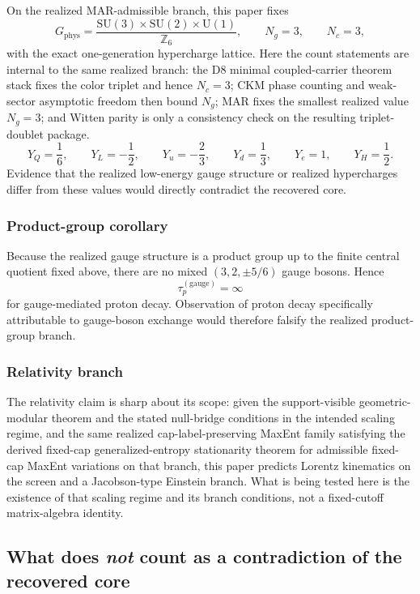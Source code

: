 \documentclass[11pt]{article}
\newcommand{\SU}{\mathrm{SU}}
\newcommand{\U}{\mathrm{U}}
\begin{document}
On the realized MAR-admissible branch, this paper fixes
\[
G_{\mathrm{phys}}=
\frac{\SU(3)\times\SU(2)\times\U(1)}{\mathbb Z_6},
\qquad
N_g=3,
\qquad
N_c=3,
\]
with the exact one-generation hypercharge lattice. Here the count statements are internal to the same realized branch: the D8 minimal coupled-carrier theorem stack fixes the color triplet and hence \(N_c=3\); CKM phase counting and weak-sector asymptotic freedom then bound \(N_g\); MAR fixes the smallest realized value \(N_g=3\); and Witten parity is only a consistency check on the resulting triplet-doublet package.
\[
Y_Q=\frac16,\qquad
Y_L=-\frac12,\qquad
Y_u=-\frac23,\qquad
Y_d=\frac13,\qquad
Y_e=1,\qquad
Y_H=\frac12.
\]
Evidence that the realized low-energy gauge structure or realized hypercharges differ from these values would directly contradict the recovered core.

\subsubsection{Product-group corollary}

Because the realized gauge structure is a product group up to the finite central quotient fixed above, there are no mixed \((3,2,\pm 5/6)\) gauge bosons. Hence
\[
\tau_p^{(\mathrm{gauge})}=\infty
\]
for gauge-mediated proton decay. Observation of proton decay specifically attributable to gauge-boson exchange would therefore falsify the realized product-group branch.

\subsubsection{Relativity branch}

The relativity claim is sharp about its scope: given the support-visible geometric-modular theorem and the stated null-bridge conditions in the intended scaling regime, and the same realized cap-label-preserving MaxEnt family satisfying the derived fixed-cap generalized-entropy stationarity theorem for admissible fixed-cap MaxEnt variations on that branch, this paper predicts Lorentz kinematics on the screen and a Jacobson-type Einstein branch. What is being tested here is the existence of that scaling regime and its branch conditions, not a fixed-cutoff matrix-algebra identity.

\subsection{What does \emph{not} count as a contradiction of the recovered core}
\end{document}
